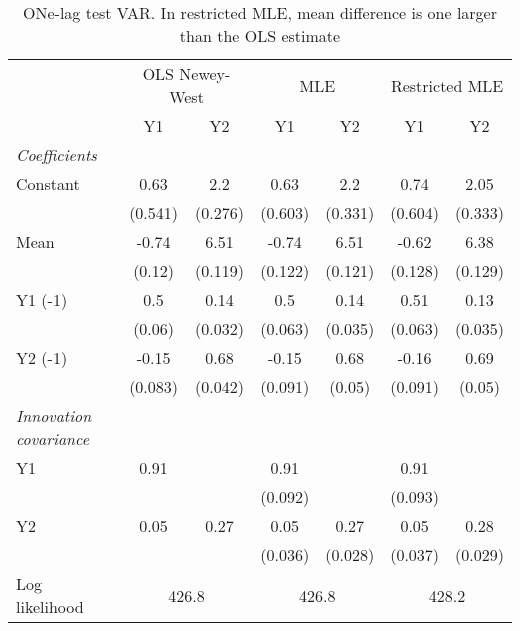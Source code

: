 \begin{table}[htbp] 
	\centering 
	\begin{tabular}{@{\extracolsep{4pt}}lcccccc@{}}		\hline\hline
		 		 & \multicolumn{2}{c}{OLS Newey-West} &\multicolumn{2}{c}{MLE} &\multicolumn{2}{c}{Restricted MLE} \\ 
 		 & Y1 	 & Y2 	 & Y1 	 & Y2 	 & Y1 	 & Y2\\\cline{2-3}\cline{4-5}\cline{6-7}
\rule{0pt}{4ex} 
 \emph{Coefficients} 	  		 & 		 & 		 & 		 & 		 & 		 &\\ 
\quad Constant 	 & 0.63 	 & 2.2 	 & 0.63 	 & 2.2 	 & 0.74 	 & 2.05	 \\ 
 		 & (0.541) 	 & (0.276) 	 & (0.603) 	 & (0.331) 	 & (0.604) 	 & (0.333) 	 \\ 
\quad Mean 	 & -0.74 	 & 6.51 	 & -0.74 	 & 6.51 	 & -0.62 	 & 6.38	 \\ 
 		 & (0.12) 	 & (0.119) 	 & (0.122) 	 & (0.121) 	 & (0.128) 	 & (0.129) 	 \\ 
\quad Y1 (-1) 	 &0.5 	 & 0.14 	 & 0.5 	 & 0.14 	 & 0.51 	 & 0.13	 \\ 
 		 & (0.06) 	 & (0.032) 	 & (0.063) 	 & (0.035) 	 & (0.063) 	 & (0.035) 	 \\ 
\quad Y2 (-1) 	 &-0.15 	 & 0.68 	 & -0.15 	 & 0.68 	 & -0.16 	 & 0.69	 \\ 
 		 & (0.083) 	 & (0.042) 	 & (0.091) 	 & (0.05) 	 & (0.091) 	 & (0.05) 	 \\ 
\rule{0pt}{4ex} \emph{Innovation covariance}  	 & 	 & 	 & 	 & 	 & 	 &\\ 
\quad Y1 	 &0.91 	 &  	 & 0.91 	 &  	 & 0.91 	 & 	 \\ 
 		 &  	 &  	 & (0.092) 	 &  	 & (0.093) 	 &  	 \\ 
\quad Y2 	 &0.05 	 & 0.27 	 & 0.05 	 & 0.27 	 & 0.05 	 & 0.28	 \\ 
 		 &  	 &  	 & (0.036) 	 & (0.028) 	 & (0.037) 	 & (0.029) 	 \\ 
 \hline \rule{0pt}{4ex} 
  Log likelihood 	 &\multicolumn{2}{c}{426.8} 	 & \multicolumn{2}{c}{426.8} 	 & \multicolumn{2}{c}{428.2}\\ 

 \hline 	\end{tabular}		\caption{ONe-lag test VAR. In restricted MLE, mean difference is one
           larger than the OLS estimate}
		\label{tab:onelag}

\end{table}